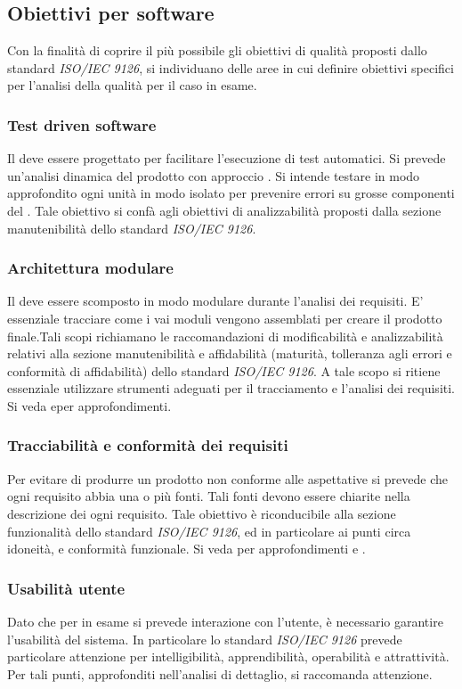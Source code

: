 \documentclass[12pt,a4paper]{article}
\begin{document}
\subsection{Obiettivi per software}

Con la finalità di coprire il più possibile gli obiettivi di qualità proposti dallo standard  \textit{ISO/IEC 9126}, si individuano delle aree in cui definire obiettivi specifici per l'analisi della qualità  per il caso in esame.
\subsubsection{Test driven software}
Il  deve essere progettato per facilitare l'esecuzione di test automatici. Si prevede un'analisi dinamica del prodotto con approccio . Si intende testare in modo approfondito ogni unità  in modo isolato per prevenire errori su grosse componenti del . Tale obiettivo si confà agli obiettivi di analizzabilità proposti dalla sezione manutenibilità dello standard \textit{ISO/IEC 9126}.
\subsubsection{Architettura modulare}
Il  deve essere scomposto in modo modulare durante l'analisi dei requisiti. E' essenziale tracciare come i vai moduli vengono assemblati per creare il prodotto finale.Tali scopi richiamano le raccomandazioni di modificabilità e analizzabilità relativi alla sezione manutenibilità e affidabilità (maturità, tolleranza agli errori e conformità di affidabilità) dello standard \textit{ISO/IEC 9126}. A tale scopo si ritiene essenziale utilizzare strumenti adeguati per il tracciamento e l'analisi dei requisiti. Si veda \NdP e\AdR per approfondimenti.
\subsubsection{Tracciabilità e conformità dei requisiti}
Per evitare di produrre un prodotto non conforme alle aspettative si prevede che ogni requisito  abbia una o più fonti. Tali fonti devono essere chiarite nella descrizione dei ogni requisito. Tale obiettivo è riconducibile alla sezione funzionalità dello standard  \textit{ISO/IEC 9126}, ed in particolare ai punti circa idoneità, e conformità funzionale. Si veda per approfondimenti \NdP e \AdR.
\subsubsection{Usabilità utente}
Dato che per  in esame si prevede interazione con l'utente, è necessario garantire l'usabilità del sistema. In particolare lo standard \textit{ISO/IEC 9126} prevede particolare attenzione per intelligibilità, apprendibilità, operabilità e attrattività. Per tali punti, approfonditi nell'analisi di dettaglio, si raccomanda attenzione.
\end{document}
